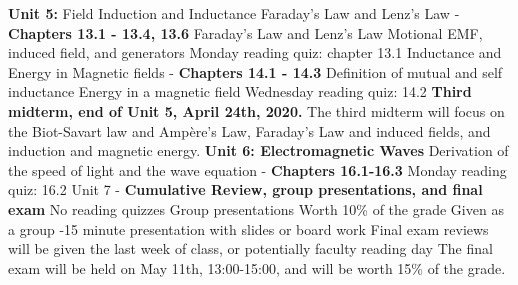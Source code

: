 \documentclass[10pt]{article}
\begin{document}
\begin{outline}[enumerate]
\1 \textbf{Unit 5:} Field Induction and Inductance
\2 Faraday's Law and Lenz's Law - \textbf{Chapters 13.1 - 13.4, 13.6}
\3 Faraday's Law and Lenz's Law
\3 Motional EMF, induced field, and generators
\3 Monday reading quiz: chapter 13.1
\2 Inductance and Energy in Magnetic fields - \textbf{Chapters 14.1 - 14.3}
\3 Definition of mutual and self inductance
\3 Energy in a magnetic field
\3 Wednesday reading quiz: 14.2
\1 \textbf{Third midterm, end of Unit 5, April 24th, 2020.} The third midterm will focus on the Biot-Savart law and Amp\`{e}re's Law, Faraday's Law and induced fields, and induction and magnetic energy.
\1 \textbf{Unit 6: Electromagnetic Waves} 
\2 Derivation of the speed of light and the wave equation - \textbf{Chapters 16.1-16.3}
\2 Monday reading quiz: 16.2
\1 Unit 7 - \textbf{Cumulative Review, group presentations, and final exam}
\2 No reading quizzes
\2 Group presentations
\3 Worth 10\% of the grade
\3 Given as a group
-15 minute presentation with slides or board work
\3 Final exam reviews will be given the last week of class, or potentially faculty reading day
\3 The final exam will be held on May 11th, 13:00-15:00, and will be worth 15\% of the grade.
\end{outline}
\end{document}
